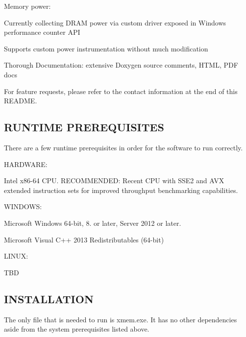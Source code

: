 Memory power\+:
\begin{DoxyItemize}
\item Currently collecting D\+R\+A\+M power via custom driver exposed in Windows performance counter A\+P\+I
\item Supports custom power instrumentation without much modification
\item Thorough Documentation\+: extensive Doxygen source comments, H\+T\+M\+L, P\+D\+F docs
\end{DoxyItemize}

For feature requests, please refer to the contact information at the end of this R\+E\+A\+D\+M\+E. 

 \subsection*{R\+U\+N\+T\+I\+M\+E P\+R\+E\+R\+E\+Q\+U\+I\+S\+I\+T\+E\+S }

There are a few runtime prerequisites in order for the software to run correctly.

H\+A\+R\+D\+W\+A\+R\+E\+:


\begin{DoxyItemize}
\item Intel x86-\/64 C\+P\+U. R\+E\+C\+O\+M\+M\+E\+N\+D\+E\+D\+: Recent C\+P\+U with S\+S\+E2 and A\+V\+X extended instruction sets for improved throughput benchmarking capabilities.
\end{DoxyItemize}

W\+I\+N\+D\+O\+W\+S\+:


\begin{DoxyItemize}
\item Microsoft Windows 64-\/bit, 8. or later, Server 2012 or later.
\item Microsoft Visual C++ 2013 Redistributables (64-\/bit)
\end{DoxyItemize}

L\+I\+N\+U\+X\+:


\begin{DoxyItemize}
\item T\+B\+D 

 \subsection*{I\+N\+S\+T\+A\+L\+L\+A\+T\+I\+O\+N }
\end{DoxyItemize}

The only file that is needed to run is xmem.\+exe. It has no other dependencies aside from the system prerequisites listed above. 

